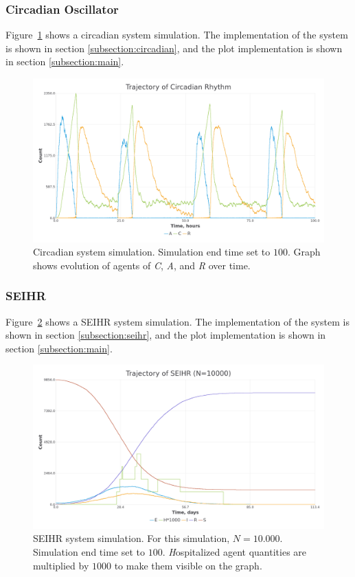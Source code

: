 \subsubsection{Circadian Oscillator}
Figure~\ref{fig:circadian_sim} shows a circadian system simulation.
The implementation of the system is shown in section \ref{subsection:circadian}, and the plot implementation is shown in section \ref{subsection:main}.

\begin{figure}[H]
\centering
\includegraphics[width=1\textwidth,height=\textheight,keepaspectratio]{images/circadian.png}
\caption{Circadian system simulation. Simulation end time set to $100$. Graph shows evolution of agents of \textit{C}, \textit{A}, and \textit{R} over time.}
\label{fig:circadian_sim}
\end{figure}

\subsubsection{SEIHR}
Figure~\ref{fig:seihr_sim} shows a SEIHR system simulation.
The implementation of the system is shown in section \ref{subsection:seihr}, and the plot implementation is shown in section \ref{subsection:main}.

\begin{figure}[H]
\centering
\includegraphics[width=1\textwidth,height=\textheight,keepaspectratio]{images/seihr.png}
\caption{SEIHR system simulation. For this simulation, $N=10.000$. Simulation end time set to $100$. \textit{H}ospitalized agent quantities are multiplied by $1000$ to make them visible on the graph.}
\label{fig:seihr_sim}
\end{figure}

